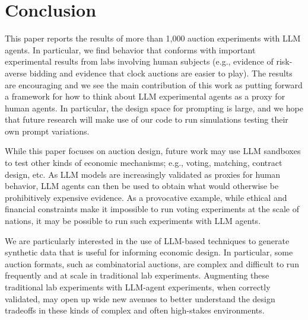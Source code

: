 \documentclass{article} %
\begin{document}
\section{Conclusion}

This paper reports the results of more than 1,000 auction experiments with LLM agents. 
In particular, we find behavior that conforms with important experimental results from labs involving human
subjects (e.g., evidence of risk-averse bidding and evidence that clock auctions are easier to play). 
The results are encouraging and we see the main contribution of this work as 
 putting forward a framework for how to think about LLM experimental agents as a proxy for human agents. In particular, the design space for prompting is large, and we hope that future research 
 will make  use of our code to run simulations testing their own prompt variations. 

While this paper focuses on auction design, future work may use LLM sandboxes to test other kinds of
economic mechanisms; e.g., voting, matching, contract design, etc.
%
As  LLM models are increasingly validated as
proxies for human behavior, LLM agents can then be used to obtain what would otherwise be prohibitively expensive evidence. 
As a provocative example, while ethical and financial constraints make it impossible to run voting experiments at the scale of nations, it may be possible to run such experiments with LLM agents. 

We are particularly interested in the use of LLM-based techniques to generate synthetic data that is useful for informing 
economic design. 
In particular, some auction formats, such as combinatorial auctions, are complex and  difficult to run frequently and at scale in traditional lab experiments. 
Augmenting these traditional lab experiments with LLM-agent  experiments, when correctly validated, may open up wide new avenues to better understand the design tradeoffs in these kinds of complex and often high-stakes environments. 



\newpage


\end{document}
